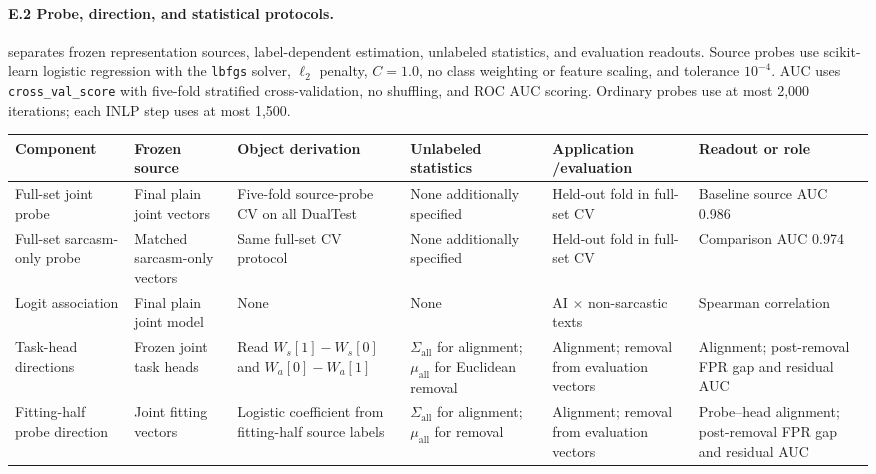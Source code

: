 \label{app:e2}\paragraph{E.2 Probe, direction, and statistical protocols.}  separates frozen representation sources, label-dependent estimation, unlabeled statistics, and evaluation readouts. Source probes use scikit-learn logistic regression with the \texttt{lbfgs} solver, $\ell_2$ penalty, $C=1.0$, no class weighting or feature scaling, and tolerance $10^{-4}$. AUC uses \texttt{cross\_val\_score} with five-fold stratified cross-validation, no shuffling, and ROC AUC scoring. Ordinary probes use at most 2{,}000 iterations; each INLP step uses at most 1{,}500.

\begin{table}[!t]
  \centering
  \footnotesize
  \setlength{\tabcolsep}{2.5pt}
  \renewcommand{\arraystretch}{1.12}
  \begin{tabularx}{\textwidth}{@{}>{\raggedright\arraybackslash}p{1.85cm}>{\raggedright\arraybackslash}p{2.25cm}>{\raggedright\arraybackslash}X>{\raggedright\arraybackslash}X>{\raggedright\arraybackslash}X>{\raggedright\arraybackslash}p{2.0cm}@{}}
    \toprule
    \textbf{Component} & \textbf{Frozen source} & \textbf{Object derivation} & \textbf{Unlabeled statistics} & \textbf{Application /}\newline\textbf{evaluation} & \textbf{Readout or role} \\
    \midrule
    Full-set joint probe & Final plain joint vectors & Five-fold source-probe CV on all DualTest & None additionally specified & Held-out fold in full-set CV & Baseline source AUC 0.986 \\
    Full-set sarcasm-only probe & Matched sarcasm-only vectors & Same full-set CV protocol & None additionally specified & Held-out fold in full-set CV & Comparison AUC 0.974 \\
    Logit association & Final plain joint model & None & None & AI $\times$ non-sarcastic texts & Spearman correlation \\
    Task-head directions & Frozen joint task heads & Read $W_s[1]-W_s[0]$ and $W_a[0]-W_a[1]$ & $\Sigma_{\mathrm{all}}$ for alignment; $\mu_{\mathrm{all}}$ for Euclidean removal & Alignment; removal from evaluation vectors & Alignment; post-removal FPR gap and residual AUC \\
    Fitting-half probe direction & Joint fitting vectors & Logistic coefficient from fitting-half source labels & $\Sigma_{\mathrm{all}}$ for alignment; $\mu_{\mathrm{all}}$ for removal & Alignment; removal from evaluation vectors & Probe--head alignment; post-removal FPR gap and residual AUC \\

\end{tabularx}
\end{table}
